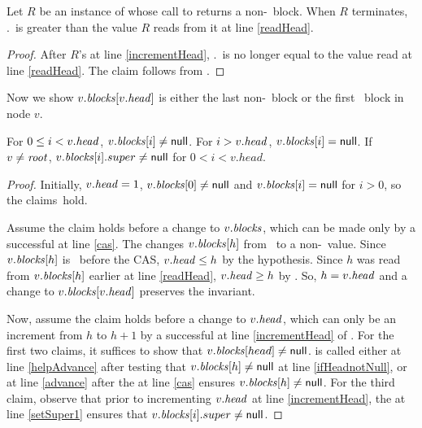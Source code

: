 \begin{lemma} \label{lem::headInc}
Let $R$ be an instance of  whose call to  returns a non-\nl\ block.  When $R$ terminates, .\head\ is greater than the value $R$ reads from it at line \ref{readHead}.
\end{lemma}
\begin{proof}
After $R$'s  at line \ref{incrementHead}, .\head\ is no longer equal to the value 
read at line \ref{readHead}.  The claim follows from .
\end{proof}

Now we show $v.\mbox{\textit{blocks}}[v.\mbox{\textit{head}}]$ is either the last non-\nl\ block or the first \nl\ block in node $v$.

\begin{invariant}\label{lem::headPosition} 
For $0 \leq i < v.\mbox{\textit{head}}$, $v.\mbox{\textit{blocks}}[i]\neq\mbox{\sf null}$.  For $i>v.\mbox{\textit{head}}$, $v.\mbox{\textit{blocks}}[i]=\mbox{\sf null}$.
If $v\neq \mbox{\textnormal{\textit{root}}}$,  $v.\mbox{\textit{blocks}}[i].super \neq \mbox{\sf null}$ for $0<i<v.head$.
\end{invariant}

\begin{proof}
Initially, $v.\mbox{\textit{head}}=1$, $v.\mbox{\textit{blocks}}[0]\neq\mbox{\sf null}$  and $v.\mbox{\textit{blocks}}[i]=\mbox{\sf null}$ for  $i>0$, so the claims~hold.

Assume the claim holds before a change to $v.\mbox{\textit{blocks}}$, which can be made only
by a successful  at line \ref{cas}.
The  changes $v.\mbox{\textit{blocks}}[h]$ from \nl\ to a non-\nl\ value.
Since $v.\mbox{\textit{blocks}}[h]$ is \nl\ before the CAS, $v.\mbox{\textit{head}} \leq h$ by the hypothesis.
Since $h$ was read from $v.\mbox{\textit{blocks}}[h]$ earlier at line \ref{readHead}, 
$v.\mbox{\textit{head}} \geq h$ by .
So, $h=v.\mbox{\textit{head}}$ and a change to $v.\mbox{\textit{blocks}}[v.\mbox{\textit{head}}]$ preserves the invariant.

Now, assume the claim holds before a change to $v.\mbox{\textit{head}}$, which can only be an increment from $h$ to $h+1$
by a successful  at line \ref{incrementHead} of .
For the first two claims, it suffices to show that $v.\mbox{\textit{blocks}}[head] \neq \mbox{\sf null}$.
 is called either at line \ref{helpAdvance} 
after testing that $v.\mbox{\textit{blocks}}[h]\neq\mbox{\sf null}$ at line \ref{ifHeadnotNull},
or at line \ref{advance} after the  at line \ref{cas} ensures $v.\mbox{\textit{blocks}}[h]\neq\mbox{\sf null}$.
For the third claim, observe that prior to incrementing $v.\mbox{\textit{head}}$ at line \ref{incrementHead},
the  at line \ref{setSuper1} ensures that $v.\mbox{\textit{blocks}}[i].super\neq \mbox{\sf null}$.
\end{proof}

